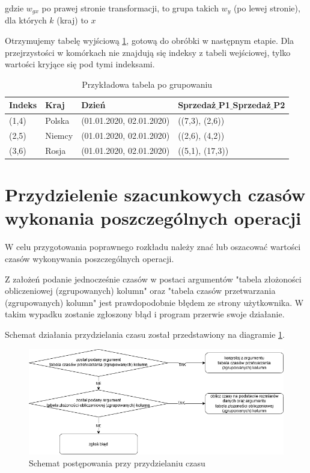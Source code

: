 \documentclass[brudnopis]{xmgr}
\begin{document}
gdzie $w_{gx}$ po prawej stronie transformacji, to grupa takich $w_y$ (po lewej stronie), dla których $k$ (kraj) to $x$
\medskip

Otrzymujemy tabelę wyjściową \ref{tab:example-output}, gotową do obróbki w następnym etapie.
Dla przejrzystości w komórkach nie znajdują się indeksy z tabeli wejściowej, tylko wartości kryjące się pod tymi indeksami.

\begin{table}[!tbh]
\begin{tabular}{|l|l|l|l|} \hline
Indeks & Kraj & Dzień & Sprzedaż$\_$P1$\_$Sprzedaż$\_$P2 \\ \hline
(1,4) & Polska & (01.01.2020, 02.01.2020) & ((7,3), (2,6)) \\ \hline
(2,5) & Niemcy & (01.01.2020, 02.01.2020) & ((2,6), (4,2)) \\ \hline
(3,6) & Rosja & (01.01.2020, 02.01.2020) & ((5,1), (17,3)) \\ \hline
\end{tabular}
\caption{Przykładowa tabela po grupowaniu\label{tab:example-output}}
\end{table}
\newpage


\section{Przydzielenie szacunkowych czasów wykonania poszczególnych operacji}

W celu przygotowania poprawnego rozkładu należy znać lub oszacować wartości czasów wykonywania poszczególnych operacji.\medskip

Z założeń podanie jednocześnie czasów w postaci argumentów "tabela złożoności obliczeniowej (zgrupowanych) kolumn" oraz "tabela czasów przetwarzania (zgrupowanych) kolumn" jest prawdopodobnie błędem ze strony użytkownika. W takim wypadku zostanie zgłoszony błąd i program przerwie swoje działanie.\medskip

Schemat działania przydzielania czasu został przedstawiony na diagramie \ref{diag:time-assign}.

\begin{figure}[!tbh]
\centering
\includegraphics[width=.9\hsize]{fig/przydzielanie_czasow.png}
\caption{Schemat postępowania przy przydzielaniu czasu\label{diag:time-assign}}
\end{figure}
\medskip
\end{document}
